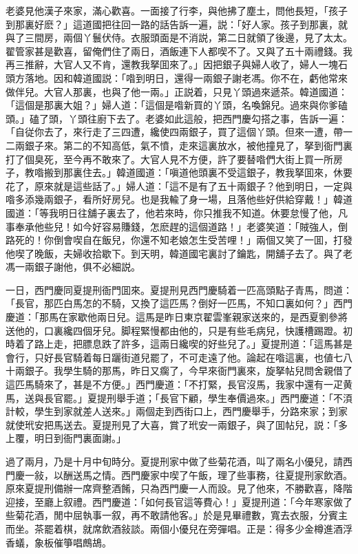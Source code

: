 老婆見他漢子來家，滿心歡喜。一面接了行李，與他拂了塵土，問他長短，「孩子到那裏好麽？」這道國把往回一路的話告訴一遍，説：「好人家。孩子到那裏，就與了三間房，兩個丫鬟伏侍。衣服頭面是不消説，第二日就領了後邊，見了太太。翟管家甚是歡喜，留俺們住了兩日，酒飯連下人都喫不了。又與了五十兩禮錢。我再三推辭，大官人又不肯，還教我拏囬來了。」因把銀子與婦人收了，婦人一塊石頭方落地。因和韓道國説：「喒到明日，還得一兩銀子謝老馮。你不在，虧他常來做伴兒。大官人那裏，也與了他一兩。」正説着，只見丫頭過來遞茶。韓道國道：「這個是那裏大姐？」婦人道：「這個是喒新買的丫頭，名喚錦兒。過來與你爹磕頭。」磕了頭，丫頭往廚下去了。老婆如此這般，把西門慶勾搭之事，告訴一遍：「自従你去了，來行走了三四遭，纔使四兩銀子，買了這個丫頭。但來一遭，帶一二兩銀子來。第二的不知高低，氣不憤，走來這裏放水，被他撞見了，拏到衙門裏打了個臭死，至今再不敢來了。大官人見不方便，許了要替喒們大街上買一所房子，教喒搬到那裏住去。」韓道國道：「嗔道他頭裏不受這銀子，教我拏囬來，休要花了，原來就是這些話了。」婦人道：「這不是有了五十兩銀子？他到明日，一定與喒多添幾兩銀子，看所好房兒。也是我輸了身一場，且落他些好供給穿戴！」韓道國道：「等我明日往舖子裏去了，他若來時，你只推我不知道。休要怠慢了他，凡事奉承他些兒！如今好容易賺錢，怎麽趕的這個道路！」老婆笑道：「賊強人，倒路死的！你倒會喫自在飯兒，你還不知老娘怎生受苦哩！」兩個又笑了一囬，打發他喫了晚飯，夫婦收拾歇下。到天明，韓道國宅裏討了鑰匙，開舖子去了。與了老馮一兩銀子謝他，俱不必細説。

一日，西門慶同夏提刑衙門囬來。夏提刑見西門慶騎着一匹高頭點子青馬，問道：「長官，那匹白馬怎的不騎，又換了這匹馬？倒好一匹馬，不知口裏如何？」西門慶道：「那馬在家歇他兩日兒。這馬是昨日東京翟雲峯親家送來的，是西夏劉參將送他的，口裏纔四個牙兒。脚程緊慢都由他的，只是有些毛病兒，快護槽踢蹬。初時着了路上走，把膘息跌了許多，這兩日纔喫的好些兒了。」夏提刑道：「這馬甚是會行，只好長官騎着每日躧街道兒罷了，不可走遠了他。論起在喒這裏，也値七八十兩銀子。我學生騎的那馬，昨日又瘸了，今早來衙門裏來，旋拏帖兒問舍親借了這匹馬騎來了，甚是不方便。」西門慶道：「不打緊，長官沒馬，我家中還有一疋黄馬，送與長官罷。」夏提刑舉手道；「長官下顧，學生奉價過來。」西門慶道：「不湏計較，學生到家就差人送來。」兩個走到西街口上，西門慶舉手，分路來家；到家就使玳安把馬送去。夏提刑見了大喜，賞了玳安一兩銀子，與了囬帖兒，説：「多上覆，明日到衙門裏面謝。」

過了兩月，乃是十月中旬時分。夏提刑家中做了些菊花酒，叫了兩名小優兒，請西門慶一敍，以酬送馬之情。西門慶家中喫了午飯，理了些事務，往夏提刑家飲酒。原來夏提刑備辦一席齊整酒餚，只為西門慶一人而設。見了他來，不勝歡喜，降階迎接，至廳上叙禮。西門慶道：「如何長官這等費心！」夏提刑道：「今年寒家做了些菊花酒，閒中屈執事一叙，再不敢請他客。」於是見畢禮數，寬去衣服，分賓主而坐。茶罷着棋，就席飲酒敍談。兩個小優兒在旁彈唱。正是：得多少金樽進酒浮香蟻，象板催箏唱鷓鴣。

